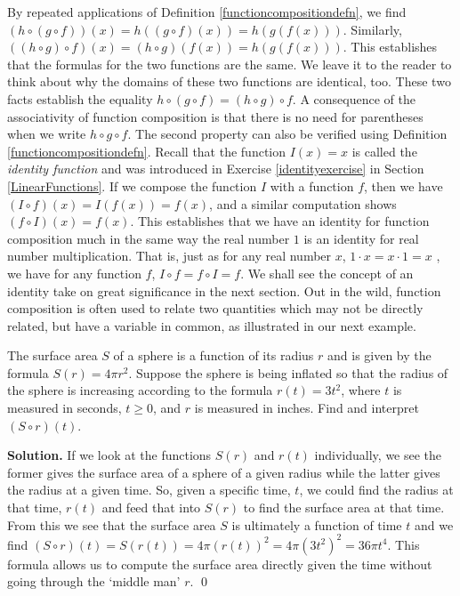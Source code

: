 \medskip

By repeated applications of Definition \ref{functioncompositiondefn}, we find  $(h \circ (g \circ f))(x) = h((g \circ f)(x)) = h(g(f(x)))$.  Similarly, $((h \circ g) \circ f)(x) = (h \circ g)(f(x)) = h(g(f(x)))$.  This establishes that the formulas for the two functions are the same.  We leave it to the reader to think about why the domains of these two functions are identical, too.  These two facts establish the equality $h \circ (g \circ f) = (h \circ g) \circ f$.  A consequence of the associativity of function composition is that there is no need for parentheses when we write $h \circ g \circ f$. The second property can also be verified using Definition \ref{functioncompositiondefn}.  Recall that the function $I(x) = x$ is called the  \textit{identity function} and was introduced in Exercise  \ref{identityexercise} in Section \ref{LinearFunctions}.  If we compose the function $I$ with a function $f$, then we have $(I \circ f)(x) = I(f(x)) = f(x)$, and a similar computation shows $(f\circ I)(x) = f(x)$. This establishes that we have an identity for function composition much in the same way the real number $1$ is an identity for real number multiplication. That is, just as for any real number $x$, $1 \cdot x = x \cdot 1 = x$ , we have for any function $f$, $ I \circ f = f \circ I =f$.  We shall see the concept of an identity take on great significance in the next section.  Out in the wild, function composition is often used to relate two quantities which may not be directly related, but have a variable in common, as illustrated in our next example.

\begin{ex}  The surface area $S$ of a sphere is a function of its radius $r$ and is given by the formula $S(r) = 4 \pi r^2$.  Suppose the sphere is being inflated so that the radius of the sphere is increasing according to the formula $r(t) = 3t^2$, where $t$ is measured in seconds, $t \geq 0$, and $r$ is measured in inches.  Find and interpret $(S \circ r)(t)$.

\smallskip

{\bf Solution.}  If we look at the functions $S(r)$ and $r(t)$ individually, we see the former gives the surface area of a sphere of a given radius while the latter gives the radius at a given time.    So, given a specific time, $t$, we could find the radius at that time, $r(t)$ and feed that into $S(r)$ to find the surface area at that time.  From this we see that the surface area $S$ is ultimately a function of time $t$ and we find $(S \circ r)(t) = S(r(t)) = 4 \pi (r(t))^2 = 4 \pi \left(3t^2\right)^2 = 36 \pi t^{4}$.  This formula allows us to compute the surface area directly given the time without going through the `middle man' $r$. \qed

\end{ex}

